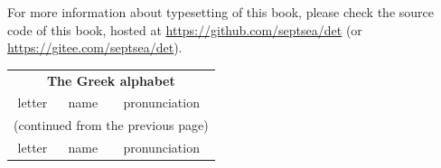 \documentclass[../libro.tex]{subfiles}
\begin{document}
For more information about typesetting of this book,
please check the source code of this book,
hosted at
\url{https://github.com/septsea/det}
(or \url{https://gitee.com/septsea/det}).

\endgroup

\clearpage
\thispagestyle{empty}

\vspace*{\fill}

\begin{longtable}[c]{llllll}
    \multicolumn{6}{c}{\textbf{The Greek alphabet}}
    \\[2ex]
    \multicolumn{2}{c}{letter}
    &
    \multicolumn{2}{c}{name}
    &
    \multicolumn{2}{c}{pronunciation}
    \\ \hline
    \endfirsthead

    \multicolumn{6}{r}{(continued from the previous page)}
    \\[2ex]
    \multicolumn{2}{c}{letter}
    &
    \multicolumn{2}{c}{name}
    &
    \multicolumn{2}{c}{pronunciation}
    \\ \hline
    \endhead


\end{longtable}
\end{document}
